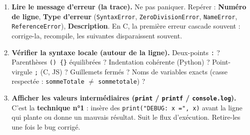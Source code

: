 \documentclass[11pt]{article}
\begin{document}
\begin{methode}
\begin{enumerate}
    \item \textbf{Lire le message d'erreur (la trace).} Ne pas paniquer. Repérer : \textbf{Numéro de ligne}, \textbf{Type d'erreur} (\texttt{SyntaxError}, \texttt{ZeroDivisionError}, \texttt{NameError}, \texttt{ReferenceError}), \textbf{Description}. En C, la première erreur cascade souvent : corrige-la, recompile, les suivantes disparaissent souvent.
    \item \textbf{Vérifier la syntaxe locale (autour de la ligne).} Deux-points \texttt{:} ? Parenthèses \texttt{() \{\}} équilibrées ? Indentation cohérente (Python) ? Point-virgule \texttt{;} (C, JS) ? Guillemets fermés ? Noms de variables exacts (casse respectée : \texttt{sommeTotale} $\neq$ \texttt{sommetotale}) ?
    \item \textbf{Afficher les valeurs intermédiaires (\texttt{print} / \texttt{printf} / \texttt{console.log}).} C'est la \textbf{technique n°1} : insère des \texttt{print("DEBUG: x =", x)} avant la ligne qui plante ou donne un mauvais résultat. Suit le flux d'exécution. Retire-les une fois le bug corrigé.
\end{enumerate}
\end{methode}
\end{document}
